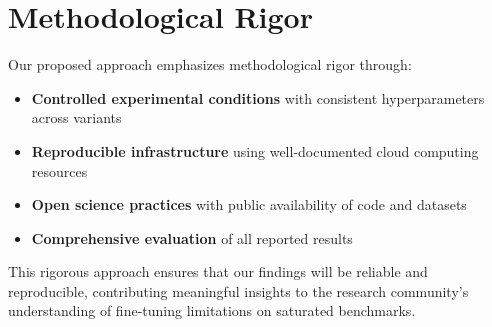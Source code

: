 \section{Methodological Rigor}

Our proposed approach emphasizes methodological rigor through:

\begin{itemize}
\item \textbf{Controlled experimental conditions} with consistent hyperparameters across variants
\item \textbf{Reproducible infrastructure} using well-documented cloud computing resources
\item \textbf{Open science practices} with public availability of code and datasets
\item \textbf{Comprehensive evaluation} of all reported results
\end{itemize}

This rigorous approach ensures that our findings will be reliable and reproducible, contributing meaningful insights to the research community's understanding of fine-tuning limitations on saturated benchmarks.
